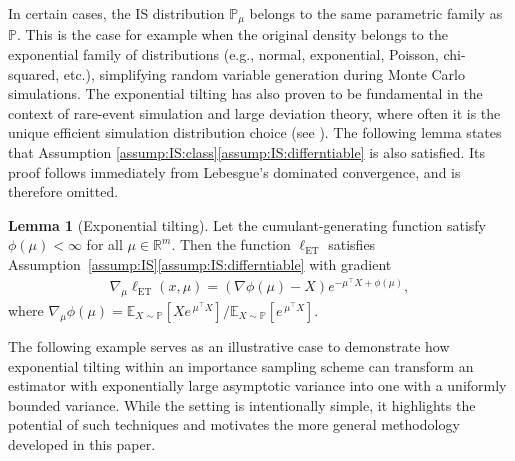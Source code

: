 \documentclass[11pt,a4paper]{article}
\theoremstyle{definition}
\newtheorem{lemma}[theorem]{Lemma}
\DeclareMathOperator*{\ET}{ET}
\begin{document}
In certain cases, the IS distribution $\mathbb P_\mu$ belongs to the same parametric family as $\mathbb P$. This is the case for example when the original density belongs to the exponential family of distributions (e.g., normal, exponential, Poisson, chi-squared, etc.), simplifying random variable generation during Monte Carlo simulations. The exponential tilting has also proven to be fundamental in the context of rare-event simulation and large deviation theory, where often it is the unique efficient simulation distribution choice (see \cite[Chapter~$5.2$]{bucklew2004introduction}). The following lemma states that Assumption \ref{assump:IS:class}\ref{assump:IS:differntiable} is also satisfied. Its proof follows immediately from Lebesgue's dominated convergence, and is therefore omitted.

\begin{lemma}[Exponential tilting]
\label{lemma:ECM:assump:IS}
Let the cumulant-generating function satisfy $\phi(\mu)<\infty$ for all $\mu \in \mathbb R^m$. 
Then the function $\ell_{\ET}$ satisfies Assumption~\ref{assump:IS}\ref{assump:IS:differntiable} with gradient
\begin{align*}
    \nabla_\mu \ell_{\ET}(x,\mu) = (\nabla \phi(\mu)-X)e^{-\mu^\top X + \phi(\mu)},
\end{align*}
where $\nabla_\mu \phi(\mu) = \mathbb E_{X \sim \mathbb P} \left[ X e^{\,\mu^\top X} \right]/\mathbb E_{X \sim \mathbb P} \left[e^{\,\mu^\top X} \right]$.
\end{lemma}

The following example serves as an illustrative case to demonstrate how exponential tilting within an importance sampling scheme can transform an estimator with exponentially large asymptotic variance into one with a uniformly bounded variance. While the setting is intentionally simple, it highlights the potential of such techniques and motivates the more general methodology developed in this paper.
\end{document}
